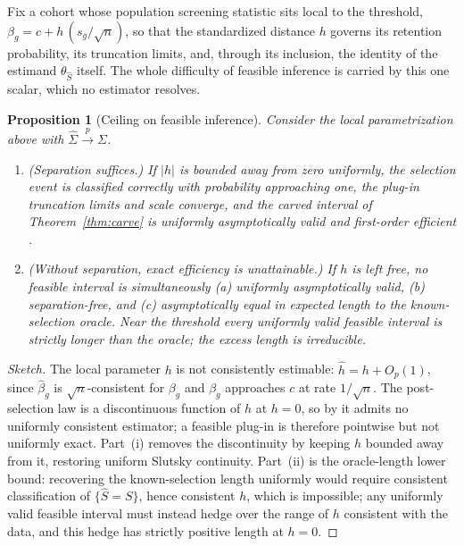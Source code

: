 \documentclass[12pt]{article}
\newtheorem{proposition}{Proposition}
\theoremstyle{remark}
\begin{document}
Fix a cohort whose population screening statistic sits local to the threshold, $\beta_g=c+h\,(s_g/\sqrt n)$,
so that the standardized distance $h$ governs its retention probability, its truncation limits, and, through
its inclusion, the identity of the estimand $\theta_{\hat S}$ itself. The whole difficulty of feasible
inference is carried by this one scalar, which no estimator resolves.

\begin{proposition}[Ceiling on feasible inference]\label{prop:sigmahat-ceiling}
Consider the local parametrization above with $\hat\Sigma\xrightarrow{p}\Sigma$.
\begin{enumerate}
\item[(i)] (\emph{Separation suffices.}) If $\lvert h\rvert$ is bounded away from zero uniformly, the
selection event is classified correctly with probability approaching one, the plug-in truncation limits and
scale converge, and the carved interval of Theorem~\ref{thm:carve} is uniformly asymptotically valid and
first-order efficient \citep{tibshirani2018}.
\item[(ii)] (\emph{Without separation, exact efficiency is unattainable.}) If $h$ is left free, no feasible
interval is simultaneously (a) uniformly asymptotically valid, (b) separation-free, and (c) asymptotically
equal in expected length to the known-selection oracle. Near the threshold every uniformly valid feasible
interval is strictly longer than the oracle; the excess length is irreducible.
\end{enumerate}
\end{proposition}

\begin{proof}[Sketch]
The local parameter $h$ is not consistently estimable: $\hat h=h+O_p(1)$, since $\hat\beta_g$ is
$\sqrt n$-consistent for $\beta_g$ and $\beta_g$ approaches $c$ at rate $1/\sqrt n$. The post-selection law
is a discontinuous function of $h$ at $h=0$, so by \citet{leeb2005,leeb2008} it admits no uniformly
consistent estimator; a feasible plug-in is therefore pointwise but not uniformly exact. Part~(i) removes the
discontinuity by keeping $h$ bounded away from it, restoring uniform Slutsky continuity. Part~(ii) is the
oracle-length lower bound: recovering the known-selection length uniformly would require consistent
classification of $\{\hat S=S\}$, hence consistent $h$, which is impossible; any uniformly valid feasible
interval must instead hedge over the range of $h$ consistent with the data, and this hedge has strictly
positive length at $h=0$.
\end{proof}
\end{document}
